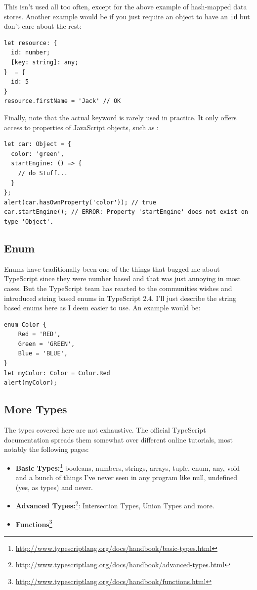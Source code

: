\documentclass[12pt,a4paper]{report}
\newcommand{\code}[1]{\fbox{\texttt{#1}}}
\begin{document}
This isn't used all too often, except for the above example of hash-mapped data stores. Another example would be if you just require an object to have an \texttt{id} but don't care about the rest:
\begin{lstlisting}
let resource: {
  id: number;
  [key: string]: any;
}  = {
  id: 5
}
resource.firstName = 'Jack' // OK
\end{lstlisting}

Finally, note that the actual \code{Object} keyword is rarely used in practice. It only offers access to properties of JavaScript objects, such as \code{hasOwnProperty}:

\begin{lstlisting}
let car: Object = {
  color: 'green',
  startEngine: () => {
    // do Stuff...
  }
};
alert(car.hasOwnProperty('color')); // true
car.startEngine(); // ERROR: Property 'startEngine' does not exist on type 'Object'.
\end{lstlisting}

\subsection{Enum}
Enums have traditionally been one of the things that bugged me about TypeScript since they were number based and that was just annoying in most cases. But the TypeScript team has reacted to the communities wishes and introduced string based enums in TypeScript 2.4. I'll just describe the string based enums here as I deem easier to use. An example would be:
\begin{lstlisting}
enum Color {
    Red = 'RED',
    Green = 'GREEN',
    Blue = 'BLUE',
}
let myColor: Color = Color.Red
alert(myColor);
\end{lstlisting}


\subsection{More Types}
The types covered here are not exhaustive. The official TypeScript documentation spreads them somewhat over different online tutorials, most notably the following pages:
\begin{itemize}
\item \textbf{Basic Types:}\footnote{\url{http://www.typescriptlang.org/docs/handbook/basic-types.html}} booleans, numbers, strings, arrays, tuple, enum, any, void and a bunch of things I've never seen in any program like null, undefined (yes, as types) and never.
\item \textbf{Advanced Types:}\footnote{\url{http://www.typescriptlang.org/docs/handbook/advanced-types.html}}: Intersection Types, Union Types and more.
\item \textbf{Functions}\footnote{\url{http://www.typescriptlang.org/docs/handbook/functions.html}}
\end{itemize}
\end{document}
